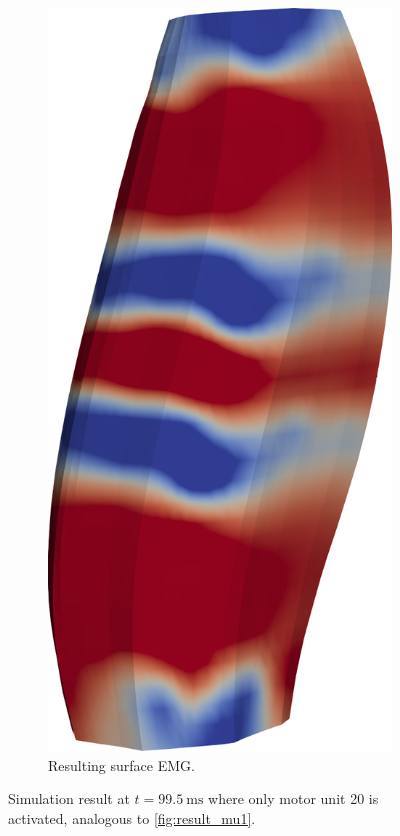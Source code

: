 \begin{figure}[H]
\begin{subfigure}[t]{0.25\textwidth}
    \includegraphics[width=\textwidth]{images/results/application/mu20b.png}%
    \caption{Resulting surface EMG.}%
    \label{fig:mu20b}%
  \end{subfigure}   
  \caption{Simulation result at $t=\SI{99.5}{\milli\second}$ where only motor unit 20 is activated, analogous to \cref{fig:result_mu1}.}%
  \label{fig:result_mu20}%
\end{figure}%

